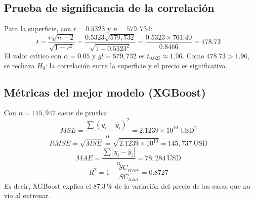 \documentclass[12pt,letterpaper]{article}
\newcommand{\paren}[1]{\left(#1\right)}
\begin{document}
\subsection{Prueba de significancia de la correlación}

Para la superficie, con $r = 0.5323$ y $n = 579,734$:
$$ t = \frac{r\sqrt{n-2}}{\sqrt{1-r^2}} = \frac{0.5323\sqrt{579{,}732}}{\sqrt{1-0.5323^2}} = \frac{0.5323 \times 761.40}{0.8466} = 478.73 $$
El valor crítico con $\alpha = 0.05$ y $gl = 579{,}732$ es $t_{0.025} \approx 1.96$. Como $478.73 > 1.96$, se rechaza $H_0$: la correlación entre la superficie y el precio es significativa.

\subsection{Métricas del mejor modelo (XGBoost)}

Con $n = 115{,}947$ casas de prueba:
$$ MSE = \frac{\sum \paren{y_i - \hat{y}_i}^2}{n} = 2.1239\times10^{10}\ \text{USD}^2 $$
$$ RMSE = \sqrt{MSE} = \sqrt{2.1239\times10^{10}} = 145{,}737\ \text{USD} $$
$$ MAE = \frac{\sum \left|y_i - \hat{y}_i\right|}{n} = 78{,}284\ \text{USD} $$
$$ R^2 = 1 - \frac{SC_{error}}{SC_{total}} = 0.8727 $$
Es decir, XGBoost explica el 87.3\,\% de la variación del precio de las casas que no vio al entrenar.
\end{document}
